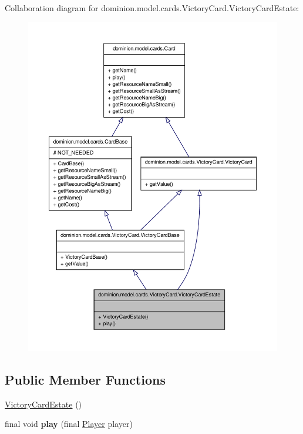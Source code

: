 \-Collaboration diagram for dominion.\-model.\-cards.\-Victory\-Card.\-Victory\-Card\-Estate\-:
\nopagebreak
\begin{figure}[H]
\begin{center}
\leavevmode
\includegraphics[width=350pt]{classdominion_1_1model_1_1cards_1_1VictoryCard_1_1VictoryCardEstate__coll__graph}
\end{center}
\end{figure}
\subsection*{\-Public \-Member \-Functions}
\begin{DoxyCompactItemize}
\item 
\hyperlink{classdominion_1_1model_1_1cards_1_1VictoryCard_1_1VictoryCardEstate_a7c8e7f4f99a81e5b9071ab52a12d164a}{\-Victory\-Card\-Estate} ()
\item 
\hypertarget{classdominion_1_1model_1_1cards_1_1VictoryCard_1_1VictoryCardEstate_a7029dba68a3dea6face390b118bc9a17}{final void {\bfseries play} (final \hyperlink{interfacedominion_1_1model_1_1Player}{\-Player} player)}\label{classdominion_1_1model_1_1cards_1_1VictoryCard_1_1VictoryCardEstate_a7029dba68a3dea6face390b118bc9a17}

\end{DoxyCompactItemize}


